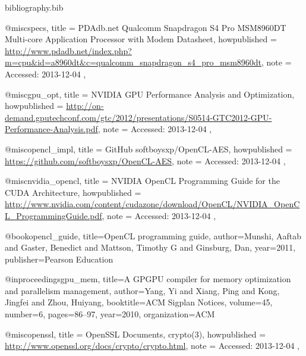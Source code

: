 \documentclass[conference,10pt]{IEEEtran}
\begin{document}
\begin{filecontents*}{bibliography.bib}

    @misc{specs,
        title = {{PDAdb.net} Qualcomm Snapdragon S4 Pro MSM8960DT Multi-core Application Processor 
        with Modem Datasheet},
        howpublished = 
        {\url{http://www.pdadb.net/index.php?m=cpu&id=a8960dt&c=qualcomm_snapdragon_s4_pro_msm8960dt}},
        note = {Accessed: 2013-12-04}
    },

    @misc{gpu_opt,
        title = {{NVIDIA} GPU Performance Analysis and Optimization},
        howpublished = 
        {\url{http://on-demand.gputechconf.com/gtc/2012/presentations/S0514-GTC2012-GPU-Performance-Analysis.pdf}},
        note = {Accessed: 2013-12-04}
    },

    @misc{opencl_impl,
        title = {{GitHub} softboysxp/OpenCL-AES},
        howpublished = {\url{https://github.com/softboysxp/OpenCL-AES}},
        note = {Accessed: 2013-12-04}
    },

    @misc{nvidia_opencl,
        title = {{NVIDIA} OpenCL Programming Guide for the CUDA Architecture},
        howpublished = 
        {\url{http://www.nvidia.com/content/cudazone/download/OpenCL/NVIDIA_OpenCL_ProgrammingGuide.pdf}},
        note = {Accessed: 2013-12-04}
    },

    @book{opencl_guide,
        title={OpenCL programming guide},
        author={Munshi, Aaftab and Gaster, Benedict and Mattson, Timothy G and Ginsburg, Dan},
        year={2011},
        publisher={Pearson Education}
    }

    @inproceedings{gpu_mem,
        title={A GPGPU compiler for memory optimization and parallelism management},
        author={Yang, Yi and Xiang, Ping and Kong, Jingfei and Zhou, Huiyang},
        booktitle={ACM Sigplan Notices},
        volume={45},
        number={6},
        pages={86--97},
        year={2010},
        organization={ACM}
    }

    @misc{openssl,
        title = {{OpenSSL} Documents, crypto(3)},
        howpublished = {\url{http://www.openssl.org/docs/crypto/crypto.html}},
        note = {Accessed: 2013-12-04}
    },

\end{filecontents*}




\end{document}
